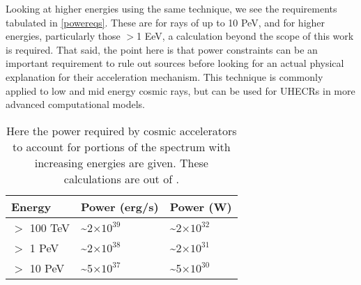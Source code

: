  Looking at higher energies using the same technique, we see the requirements tabulated in \autoref{powereqs}. These are for rays of up to 10 PeV, and for higher energies, particularly those $>$1 EeV, a calculation beyond the scope of this work is required. That said, the point here is that power constraints can be an important requirement to rule out sources before looking for an actual physical explanation for their acceleration mechanism. This technique is commonly applied to low and mid energy cosmic rays, but can be used for UHECRs in more advanced computational models.

 \begin{table}

 \begin{center}
\begin{tabular}{|l|l|l|} \hline
 Energy & Power (erg/s)  & Power (W)  \\ \hline
 $>$ 100 TeV& \textasciitilde2$\times10^{39}$ &\textasciitilde2$\times10^{32}$ \\ \hline
 $>$ 1 PeV& \textasciitilde2$\times10^{38}$ &\textasciitilde 2$\times10^{31}$ \\ \hline
$>$ 10 PeV &\textasciitilde 5$\times10^{37}$ &\textasciitilde 5$\times10^{30}$  \\ \hline
\end{tabular}
\end{center}
\caption[Power of Cosmic Accelerators]{Here the power required by cosmic accelerators to account for portions of the spectrum with increasing energies are given. These calculations are out of \cite{crapp}.}
 \label{powereqs}
\end{table}

